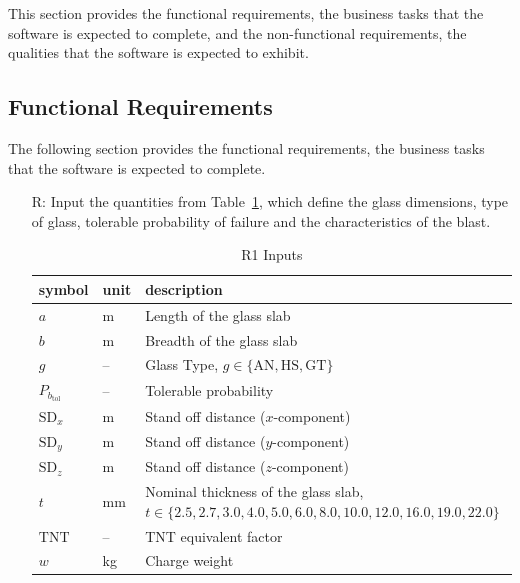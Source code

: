 \documentclass[12pt]{article}
\newcounter{reqnum} %
\begin{document}
This section provides the functional requirements, the business tasks that the software is expected to complete, and the non-functional requirements, the qualities that the software is expected to exhibit.
  
\subsection{Functional Requirements} \label{Func}

The following section provides the functional requirements, the business tasks
that the software is expected to complete.

\noindent \begin{itemize}

\item[R\refstepcounter{reqnum}\thereqnum \label{Input}:] Input the quantities
  from Table~\ref{TblReqInput}, which define the glass dimensions, type of glass, tolerable probability of
  failure and the characteristics of the blast.

\renewcommand{\arraystretch}{1.2}

\begin{table}[!h]
\caption{R1 Inputs} 
\label{TblReqInput}
\renewcommand{\arraystretch}{1.2}
\begin{tabular}{l l p{11cm}} 
\toprule
\textbf{symbol} & \textbf{unit} & \textbf{description}\\
\midrule 
$a$ & \si{\metre}	& Length of the glass slab\\
$b$ & \si{\metre}	& Breadth of the glass slab\\
$g$ & -- & Glass Type, $g \in \{ \text{AN}, \text{HS}, \text{GT} \}$\\
$P_{b_{\text{tol}}}$ & -- & Tolerable probability\\
$\text{SD}_x$ & \si{\meter} & Stand off distance ($x$-component)\\
$\text{SD}_y$ & \si{\metre} & Stand off distance ($y$-component)\\
$\text{SD}_z$ & \si{\metre} & Stand off distance ($z$-component)\\
$t$ & \si{\milli\metre}	& Nominal thickness of the glass slab,\newline $t \in
                                  \{2.5, 2.7, 3.0, 4.0, 5.0, 6.0, 8.0, 10.0,
                                  12.0, 16.0, 19.0, 22.0\}$ \\
$\text{TNT}$ & -- & TNT equivalent factor\\
$w$ & \si{\kilo\gram}	& Charge weight\\
\bottomrule
\end{tabular}
\end{table}


\end{itemize}
\end{document}
